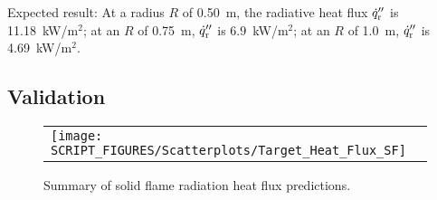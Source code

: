 \noindent Expected result: At a radius $R$ of 0.50~m, the radiative heat flux $\dot q''\sb{r}$ is 11.18~kW/m$^2$; at an $R$ of 0.75~m, $\dot q''\sb{r}$ is 6.9~kW/m$^2$; at an $R$ of 1.0~m, $\dot q''\sb{r}$ is 4.69~kW/m$^2$.

\subsection*{Validation}

\begin{figure}[!ht]
\begin{center}
\begin{tabular}{l}
\texttt{[image: SCRIPT\_FIGURES/Scatterplots/Target\_Heat\_Flux\_SF]}
\end{tabular}
\end{center}
\caption[Summary of solid flame radiation heat flux predictions]
{Summary of solid flame radiation heat flux predictions.}
\label{Heat_Flux_Solid_Flame_Summary}
\end{figure}
